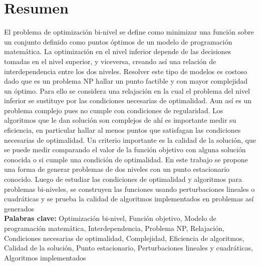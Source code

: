 \chapter*{Resumen}
El problema de optimización bi-nivel se define como minimizar una función sobre un conjunto definido como puntos óptimos de un modelo de programación matemática. La optimización en el nivel inferior depende de las decisiones tomadas en el nivel superior, y viceversa, creando así una relación de interdependencia entre los dos niveles.
Resolver este tipo de modelos es costoso dado que es un problema NP hallar un punto factible y con mayor complejidad un óptimo. Para ello se considera una relajación en la cual el problema del nivel inferior se sustituye por las condiciones necesarias de optimalidad. Aun así es un problema complejo pues no cumple con condiciones de regularidad. Los algoritmos que le dan solución son complejos de ahí es importante medir su eficiencia, en particular hallar al menos puntos que satisfagan las condiciones necesarias de optimalidad. Un criterio importante es la calidad de la solución, que se puede medir comparando el valor de la función objetivo con alguna solución conocida o si cumple una condición  de optimalidad. En este trabajo  se propone una forma de generar problemas de dos niveles con un punto estacionario conocido. Luego de estudiar las condiciones de optimalidad y algoritmos  para problemas bi-niveles, se construyen las funciones usando perturbaciones lineales o cuadráticas y se prueba la calidad de algoritmos implementados en problemas así 
generados\\
\textbf{Palabras clave:} Optimización bi-nivel, Función objetivo, Modelo de programación matemática, Interdependencia, Problema NP, Relajación, Condiciones necesarias de optimalidad, Complejidad, Eficiencia de algoritmos, Calidad de la solución, Punto estacionario, Perturbaciones lineales y cuadráticas, Algoritmos implementados

